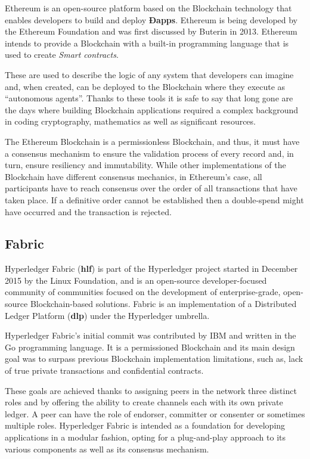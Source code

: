   Ethereum is an open-source platform based on the Blockchain technology that
  enables developers to build and deploy \textbf{Ðapps}. Ethereum is being
  developed by the Ethereum Foundation and was first discussed by Buterin in
  2013.  Ethereum intends to provide a Blockchain with a built-in programming
  language that is used to create \textit{Smart contracts}.  \cite{Wood2017}

  These are used to describe the logic of any system that developers can
  imagine and, when created, can be deployed to the Blockchain where they
  execute as “autonomous agents”.  Thanks to these tools it is safe to say that
  long gone are the days where building Blockchain applications required a
  complex background in coding cryptography, mathematics as well as significant
  resources.\cite{Wood2017,BlockGeeks2017}

  The Ethereum Blockchain is a permissionless Blockchain, and thus, it must
  have a consensus mechanism to ensure the validation process of every record
  and, in turn, ensure resiliency and immutability. While other implementations
  of the Blockchain have different consensus mechanics, in Ethereum’s case, all
  participants have to reach consensus over the order of all transactions that
  have taken place. If a definitive order cannot be established then a
  double-spend might have occurred and the transaction is rejected.
  \cite{Wood2017}

  \subsection{Fabric}

  Hyperledger Fabric (\textbf{hlf}) is part of the Hyperledger project started
  in December 2015 by the Linux Foundation, and is an open-source
  developer-focused community of communities focused on the development of
  enterprise-grade, open-source Blockchain-based solutions.  Fabric is an
  implementation of a Distributed Ledger Platform (\textbf{dlp}) under the
  Hyperledger umbrella.  \cite{Cachin2016}

  Hyperledger Fabric’s initial commit was contributed by IBM and written in the
  Go programming language.  It is a permissioned Blockchain and its main design
  goal was to surpass previous Blockchain implementation limitations, such as,
  lack of true private transactions and confidential contracts.

  These goals are achieved thanks to assigning peers in the network three
  distinct roles and by offering the ability to create channels each with its
  own private ledger.  A peer can have the role of endorser, committer or
  consenter or sometimes multiple roles.  Hyperledger Fabric is intended as a
  foundation for developing applications in a modular fashion, opting for a
  plug-and-play approach to its various components as well as its consensus
  mechanism. \cite{HyperledgerFabricDocs2017}

